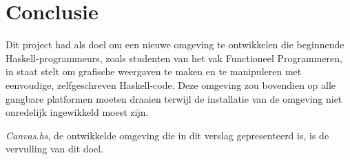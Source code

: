 \chapter{Conclusie} \label{hoofdstuk:conclusie}
Dit project had als doel om een nieuwe omgeving te ontwikkelen die beginnende Haskell-programmeurs, zoals studenten van het vak Functioneel Programmeren, in staat stelt om grafische weergaven te maken en te manipuleren met eenvoudige, zelfgeschreven Haskell-code. Deze omgeving zou bovendien op alle gangbare platformen moeten draaien terwijl de installatie van de omgeving niet onredelijk ingewikkeld moest zijn.

\emph{Canvas.hs}, de ontwikkelde omgeving die in dit verslag gepresenteerd is, is de vervulling van dit doel.

